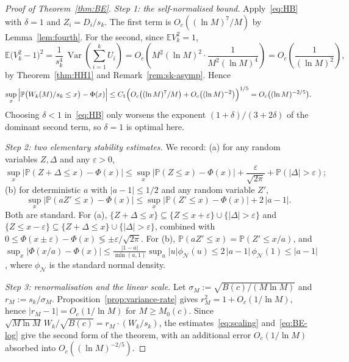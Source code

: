 \documentclass[11pt]{article}
\theoremstyle{remark}
\newcommand{\PP}{\mathbb{P}}
\newcommand{\EE}{\mathbb{E}}
\newcommand{\NN}{\mathcal{N}}
\newcommand{\eps}{\varepsilon}
\DeclareMathOperator{\Var}{Var}
\begin{document}
\begin{proof}[Proof of Theorem~\ref{thm:BE}]
\emph{Step 1: the self-normalised bound.} Apply~\eqref{eq:HB} with $\delta = 1$ and $Z_i = D_i/s_k$. The first term is $O_c((\ln M)^7/M)$ by Lemma~\ref{lem:fourth}. For the second, since $\EE V_k^2 = 1$,
\[
\EE \bigl( V_k^2 - 1 \bigr)^2
= \frac{1}{s_k^4}\, \Var\!\left( \sum_{i=1}^k U_i \right)
= O_c\!\left( M^2 (\ln M)^2 \cdot \frac{1}{M^2 (\ln M)^4} \right)
= O_c\!\left( \frac{1}{(\ln M)^2} \right),
\]
by Theorem~\ref{thm:HH1} and Remark~\ref{rem:sk-asymp}. Hence
\begin{equation}\label{eq:BE-log}
\sup_{x}\, \Bigl| \PP\bigl( W_k(M)/s_k \leq x \bigr) - \Phi(x) \Bigr|
\leq C_1 \Bigl( O_c\bigl( (\ln M)^7/M \bigr) + O_c\bigl( (\ln M)^{-2} \bigr) \Bigr)^{1/5}
= O_c\bigl( (\ln M)^{-2/5} \bigr).
\end{equation}
Choosing $\delta < 1$ in~\eqref{eq:HB} only worsens the exponent $(1+\delta)/(3+2\delta)$ of the dominant second term, so $\delta = 1$ is optimal here.

\emph{Step 2: two elementary stability estimates.} We record: (a) for any random variables $Z, \Delta$ and any $\eps > 0$,
\begin{equation}\label{eq:smoothing}
\sup_x \bigl| \PP(Z + \Delta \leq x) - \Phi(x) \bigr|
\leq \sup_x \bigl| \PP(Z \leq x) - \Phi(x) \bigr| + \frac{\eps}{\sqrt{2\pi}} + \PP(|\Delta| > \eps);
\end{equation}
(b) for deterministic $a$ with $|a - 1| \leq 1/2$ and any random variable $Z'$,
\begin{equation}\label{eq:scaling}
\sup_x \bigl| \PP(a Z' \leq x) - \Phi(x) \bigr|
\leq \sup_x \bigl| \PP(Z' \leq x) - \Phi(x) \bigr| + 2\, |a - 1|.
\end{equation}
Both are standard. For (a), $\{Z + \Delta \leq x\} \subseteq \{Z \leq x + \eps\} \cup \{|\Delta| > \eps\}$ and $\{Z \leq x - \eps\} \subseteq \{Z + \Delta \leq x\} \cup \{|\Delta| > \eps\}$, combined with $0 \leq \Phi(x \pm \eps) - \Phi(x) \lessgtr \pm\eps/\sqrt{2\pi}$. For (b), $\PP(aZ' \leq x) = \PP(Z' \leq x/a)$, and $\sup_x |\Phi(x/a) - \Phi(x)| \leq \frac{|1-a|}{\min(a,1)} \sup_u |u| \phi_{\NN}(u) \leq 2\,|a-1|\, \phi_{\NN}(1) \leq |a - 1|$, where $\phi_{\NN}$ is the standard normal density.

\emph{Step 3: renormalisation and the linear scale.} Let $\sigma_M := \sqrt{B(c)/(M \ln M)}$ and $r_M := s_k/\sigma_M$. Proposition~\ref{prop:variance-rate} gives $r_M^2 = 1 + O_c(1/\ln M)$, hence $|r_M - 1| = O_c(1/\ln M)$ for $M \geq M_0(c)$. Since $\sqrt{M \ln M}\, W_k/\sqrt{B(c)} = r_M \cdot (W_k/s_k)$, the estimates~\eqref{eq:scaling} and~\eqref{eq:BE-log} give the second form of the theorem, with an additional error $O_c(1/\ln M)$ absorbed into $O_c((\ln M)^{-2/5})$.


\end{proof}
\end{document}
